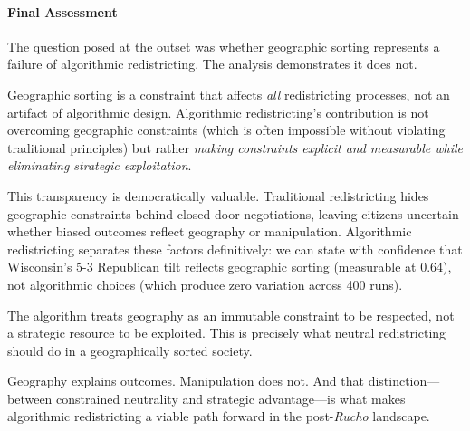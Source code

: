 \paragraph{Final Assessment}

The question posed at the outset was whether geographic sorting represents a failure of algorithmic redistricting. The analysis demonstrates it does not.

Geographic sorting is a constraint that affects \textit{all} redistricting processes, not an artifact of algorithmic design. Algorithmic redistricting's contribution is not overcoming geographic constraints (which is often impossible without violating traditional principles) but rather \textit{making constraints explicit and measurable while eliminating strategic exploitation}.

This transparency is democratically valuable. Traditional redistricting hides geographic constraints behind closed-door negotiations, leaving citizens uncertain whether biased outcomes reflect geography or manipulation. Algorithmic redistricting separates these factors definitively: we can state with confidence that Wisconsin's 5-3 Republican tilt reflects geographic sorting (measurable at 0.64), not algorithmic choices (which produce zero variation across 400 runs).

The algorithm treats geography as an immutable constraint to be respected, not a strategic resource to be exploited. This is precisely what neutral redistricting should do in a geographically sorted society.

Geography explains outcomes. Manipulation does not. And that distinction---between constrained neutrality and strategic advantage---is what makes algorithmic redistricting a viable path forward in the post-\textit{Rucho} landscape.
